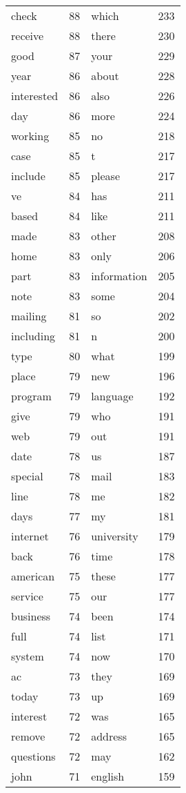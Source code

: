\documentclass[10pt, a4paper]{article}
\begin{document}
\begin{longtable}{l c l c}
check & 88 & which & 233 \\
receive & 88 & there & 230 \\
good & 87 & your & 229 \\
year & 86 & about & 228 \\
interested & 86 & also & 226 \\
day & 86 & more & 224 \\
working & 85 & no & 218 \\
case & 85 & t & 217 \\
include & 85 & please & 217 \\
ve & 84 & has & 211 \\
based & 84 & like & 211 \\
made & 83 & other & 208 \\
home & 83 & only & 206 \\
part & 83 & information & 205 \\
note & 83 & some & 204 \\
mailing & 81 & so & 202 \\
including & 81 & n & 200 \\
type & 80 & what & 199 \\
place & 79 & new & 196 \\
program & 79 & language & 192 \\
give & 79 & who & 191 \\
web & 79 & out & 191 \\
date & 78 & us & 187 \\
special & 78 & mail & 183 \\
line & 78 & me & 182 \\
days & 77 & my & 181 \\
internet & 76 & university & 179 \\
back & 76 & time & 178 \\
american & 75 & these & 177 \\
service & 75 & our & 177 \\
business & 74 & been & 174 \\
full & 74 & list & 171 \\
system & 74 & now & 170 \\
ac & 73 & they & 169 \\
today & 73 & up & 169 \\
interest & 72 & was & 165 \\
remove & 72 & address & 165 \\
questions & 72 & may & 162 \\
john & 71 & english & 159 \\

\end{longtable}
\end{document}

